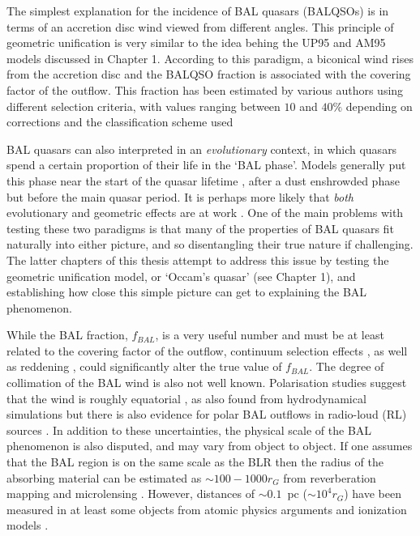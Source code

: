 The simplest explanation for the incidence of 
BAL quasars (BALQSOs) is in terms of an accretion disc wind viewed
from different angles. This principle of geometric unification
is very similar to the idea behing the UP95 and AM95 models discussed in Chapter 1.
According to this paradigm, a biconical wind rises from 
the accretion disc and the BALQSO fraction is associated with
the covering factor of the outflow. This fraction
has been estimated by various authors using different selection criteria, with
values ranging between $10$ and $40\%$ depending on corrections 
and the classification scheme used 
\citep{weymann1991, trump2006, knigge2008, dai2008, allen2011}


BAL quasars can also interpreted in an {\em evolutionary}
context, in which quasars spend a certain proportion of their life
in the `BAL phase'. Models generally put this phase near the start
of the quasar lifetime \citep{hazard1984,surdej1987,boroson1992,zubovas2013}, 
after a dust enshrowded phase but before
the main quasar period. It is perhaps more likely that {\em both} 
evolutionary and geometric effects are at work \citep{borguet2010,dai2012}.
One of the main problems with testing these two paradigms is that many of
the properties of BAL quasars fit naturally into either picture, and so
disentangling their true nature if challenging. 
The latter chapters of this thesis attempt to address this issue by testing the 
geometric unification model, or `Occam's quasar' (see Chapter 1),
and establishing how close this simple picture can get to explaining 
the BAL phenomenon.  

While the BAL fraction, $f_{BAL}$, is a very useful number and must be at least
related to the covering factor of the outflow, continuum selection
effects \citep{goodrich1997,krolikvoit1998}, 
as well as reddening \citep{allen2011}, could significantly
alter the true value of $f_{BAL}$. The degree of collimation of the BAL wind
is also not well known. Polarisation studies suggest that the 
wind is roughly equatorial \citep{goodrich1995, cohen1995}, 
as also found from hydrodynamical simulations  
but there is also evidence for polar BAL outflows in 
radio-loud (RL) sources \citep{zhou2006,ghoshpunsly2007}.
In addition to these uncertainties, the physical scale of the BAL
phenomenon is also disputed, and may vary from object to object.
If one assumes that the BAL region is on the same scale as 
the BLR then the radius of the absorbing material
can be estimated as $\sim 100-1000 r_G$ from reverberation mapping
and microlensing \citep[e.g., for BLRs in BALQSOs,][]{sluse2015,odowd2015}.
However, distances of  $\sim0.1$~pc ($\sim 10^4 r_G$) have been measured in at least 
some objects from atomic physics arguments and ionization models
\citep{borguet2013,chamberlain2015}.


